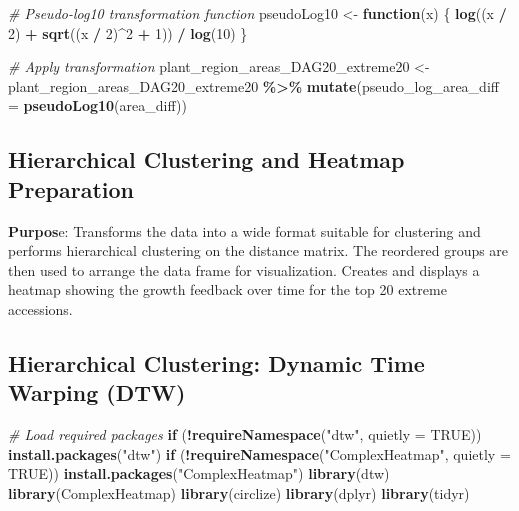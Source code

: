 \documentclass[
  11pt,
]{article}
\newenvironment{Shaded}{\begin{snugshade}}{\end{snugshade}}
\newcommand{\AttributeTok}[1]{\textcolor[rgb]{0.13,0.29,0.53}{#1}}
\newcommand{\CommentTok}[1]{\textcolor[rgb]{0.56,0.35,0.01}{\textit{#1}}}
\newcommand{\ConstantTok}[1]{\textcolor[rgb]{0.56,0.35,0.01}{#1}}
\newcommand{\ControlFlowTok}[1]{\textcolor[rgb]{0.13,0.29,0.53}{\textbf{#1}}}
\newcommand{\DecValTok}[1]{\textcolor[rgb]{0.00,0.00,0.81}{#1}}
\newcommand{\FunctionTok}[1]{\textcolor[rgb]{0.13,0.29,0.53}{\textbf{#1}}}
\newcommand{\NormalTok}[1]{#1}
\newcommand{\OtherTok}[1]{\textcolor[rgb]{0.56,0.35,0.01}{#1}}
\newcommand{\SpecialCharTok}[1]{\textcolor[rgb]{0.81,0.36,0.00}{\textbf{#1}}}
\newcommand{\StringTok}[1]{\textcolor[rgb]{0.31,0.60,0.02}{#1}}
\begin{document}
\begin{Shaded}
\begin{Highlighting}[]
\CommentTok{\# Pseudo{-}log10 transformation function}
\NormalTok{pseudoLog10 }\OtherTok{\textless{}{-}} \ControlFlowTok{function}\NormalTok{(x) \{ }
  \FunctionTok{log}\NormalTok{((x }\SpecialCharTok{/} \DecValTok{2}\NormalTok{) }\SpecialCharTok{+} \FunctionTok{sqrt}\NormalTok{((x }\SpecialCharTok{/} \DecValTok{2}\NormalTok{)}\SpecialCharTok{\^{}}\DecValTok{2} \SpecialCharTok{+} \DecValTok{1}\NormalTok{)) }\SpecialCharTok{/} \FunctionTok{log}\NormalTok{(}\DecValTok{10}\NormalTok{)}
\NormalTok{\}}

\CommentTok{\# Apply transformation}
\NormalTok{plant\_region\_areas\_DAG20\_extreme20 }\OtherTok{\textless{}{-}}\NormalTok{ plant\_region\_areas\_DAG20\_extreme20 }\SpecialCharTok{\%\textgreater{}\%}
  \FunctionTok{mutate}\NormalTok{(}\AttributeTok{pseudo\_log\_area\_diff =} \FunctionTok{pseudoLog10}\NormalTok{(area\_diff))}
\end{Highlighting}
\end{Shaded}

\subsection{Hierarchical Clustering and Heatmap
Preparation}\label{hierarchical-clustering-and-heatmap-preparation}

\textbf{Purpos}e: Transforms the data into a wide format suitable for
clustering and performs hierarchical clustering on the distance matrix.
The reordered groups are then used to arrange the data frame for
visualization. Creates and displays a heatmap showing the growth
feedback over time for the top 20 extreme accessions.

\subsection{Hierarchical Clustering: Dynamic Time Warping
(DTW)}\label{hierarchical-clustering-dynamic-time-warping-dtw}

\begin{Shaded}
\begin{Highlighting}[]
\CommentTok{\# Load required packages}
\ControlFlowTok{if}\NormalTok{ (}\SpecialCharTok{!}\FunctionTok{requireNamespace}\NormalTok{(}\StringTok{"dtw"}\NormalTok{, }\AttributeTok{quietly =} \ConstantTok{TRUE}\NormalTok{)) }\FunctionTok{install.packages}\NormalTok{(}\StringTok{"dtw"}\NormalTok{)}
\ControlFlowTok{if}\NormalTok{ (}\SpecialCharTok{!}\FunctionTok{requireNamespace}\NormalTok{(}\StringTok{"ComplexHeatmap"}\NormalTok{, }\AttributeTok{quietly =} \ConstantTok{TRUE}\NormalTok{)) }\FunctionTok{install.packages}\NormalTok{(}\StringTok{"ComplexHeatmap"}\NormalTok{)}
\FunctionTok{library}\NormalTok{(dtw)}
\FunctionTok{library}\NormalTok{(ComplexHeatmap)}
\FunctionTok{library}\NormalTok{(circlize)}
\FunctionTok{library}\NormalTok{(dplyr)}
\FunctionTok{library}\NormalTok{(tidyr)}
\end{Highlighting}
\end{Shaded}
\end{document}
